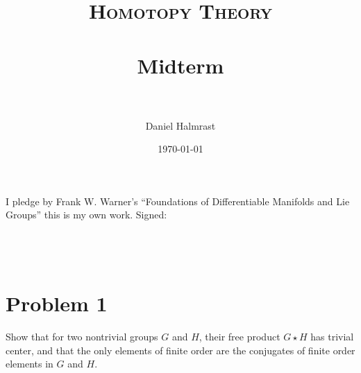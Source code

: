 \documentclass[fontsize=11pt]{scrartcl} %
\title{	
\normalfont \normalsize 
\textsc{Homotopy Theory} \\ [25pt] %
\horrule{0.5pt} \\[0.4cm] %
\huge Midterm \\ %
\horrule{2pt} \\[0.5cm] %
}
\author{Daniel Halmrast} %
\date{\normalsize\today} %
\numberwithin{equation}{section} %
\numberwithin{figure}{section} %
\numberwithin{table}{section} %
\begin{document}
\maketitle %

I pledge by Frank W. Warner's ``Foundations of Differentiable Manifolds and Lie
Groups'' this is my own work. Signed:
\\
\\
\\
\\

\section*{Problem 1}
Show that for two nontrivial groups $G$ and $H$, their free product $G\star H$
has trivial center, and that the only elements of finite order are the
conjugates of finite order elements in $G$ and $H$.
\\
\\
\end{document}

